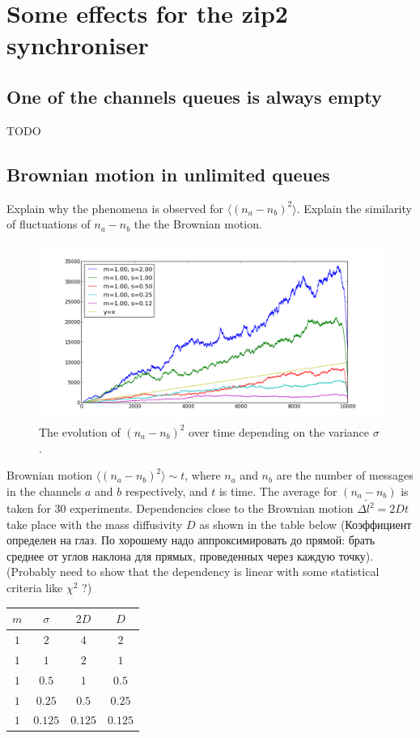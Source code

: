 \chapter{Some effects for the zip2 synchroniser}
  \section{One of the channels queues is always empty}
TODO

  \section{Brownian motion in unlimited queues}
Explain why the phenomena is observed for $\langle (n_{a} - n_{b})^{2} \rangle$. Explain the similarity of fluctuations of $n_{a} - n_{b}$ the the Brownian motion.
  \begin{figure}[h!]
  \centering
  \includegraphics[scale=0.4]{figs/all.png}
  \caption{The evolution of $(n_{a} - n_{b})^{2}$ over time depending on the variance $\sigma$.}
  \label{fig:brownian}
  \end{figure}

Brownian motion $\langle (n_{a} - n_{b})^{2} \rangle \sim t$, where $n_{a}$ and $n_{b}$ are the number of messages in the channels $a$ and $b$ respectively, and $t$ is time. The average for $(n_{a} - n_{b})$ is taken for 30 experiments. Dependencies close to the Brownian motion $\bar{\Delta l^2} = 2Dt$ take place with the mass diffusivity $D$ as shown in the table below (Коэффициент определен на глаз. По хорошему надо аппроксимировать до прямой: брать среднее от углов наклона для прямых, проведенных через каждую точку). (Probably need to show that the dependency is linear with some statistical criteria like $\chi^{2}$ ?)
  \begin{tabular}{c|c|c|c}
  $m$ & $\sigma$ & $2D$ & $D$\\
  \hline
  $1$ & $2$ & $4$ & $2$\\
  \hline
  $1$ & $1$ & $2$ & $1$\\
  \hline
  $1$ & $0.5$ & $1$ & $0.5$\\
  \hline
  $1$ & $0.25$ & $0.5$ & $0.25$\\
  \hline
  $1$ & $0.125$ & $0.125$ & $0.125$\\ 
  \end{tabular}

